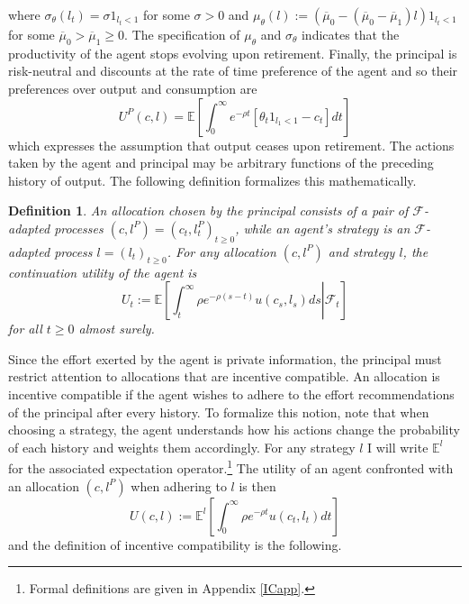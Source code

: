 \documentclass[11pt]{article}
\theoremstyle{plain}
\newtheorem{defn}{Definition}[section]
\begin{document}
where $\sigma_{\theta}(l_t) = \sigma 1_{l_t< 1}$ for some $\sigma>0$ and $\mu_{\theta}(l) := (\overline{\mu}_0 - (\overline{\mu}_0- \overline{\mu}_1)l)1_{l_t<1}$ for some $\overline{\mu}_0 > \overline{\mu}_1 \geq 0$. The specification of $\mu_{\theta}$ and $\sigma_{\theta}$ indicates that the productivity of the agent stops evolving upon retirement. Finally, the principal is risk-neutral and discounts at the rate of time preference of the agent and so their preferences over output and consumption are
\begin{equation}
U^P(c,l) = \mathbb{E}{\left[\int_{0}^{\infty}e^{-\rho t}[\theta_t1_{l_1<1} - c_t]dt\right]}
\label{prefprin}
\end{equation}
which expresses the assumption that output ceases upon retirement. The actions taken by the agent and principal may be arbitrary functions of the preceding history of output. The following definition formalizes this mathematically.
\begin{defn}
An allocation chosen by the principal consists of a pair of $\mathcal{F}$-adapted processes $(c,l^P) = (c_t,l_t^P)_{t\geq0}$, while an agent's strategy is an $\mathcal{F}$-adapted process $l = (l_t)_{t\geq0}$. For any allocation $(c,l^P)$ and strategy $l$, the continuation utility of the agent is 
\begin{equation}
U_t := \mathbb{E}{\left[\left. \int_t^{\infty}\rho e^{-\rho (s-t)} u(c_s,l_s) ds\right| \mathcal{F}_t \right]}
\label{contutil}
\end{equation}
for all $t\geq0$ almost surely. 
\end{defn} 


Since the effort exerted by the agent is private information, the principal must restrict attention to allocations that are incentive compatible. An allocation is incentive compatible if the agent wishes to adhere to the effort recommendations of the principal after every history. To formalize this notion, note that when choosing a strategy, the agent understands how his actions change the probability of each history and weights them accordingly. For any strategy $l$ I will write $\mathbb{E}^l$ for the associated expectation operator.\footnote{Formal definitions are given in Appendix \ref{ICapp}.} The utility of an agent confronted with an allocation $(c,l^P)$ when adhering to $l$ is then
\begin{equation}
U(c,l) := \mathbb{E}^l{\left[\int_0^{\infty}\rho e^{-\rho t} u(c_t,l_t) dt\right]}
\label{payofflie}
\end{equation}
and the definition of incentive compatibility is the following.
\end{document}
